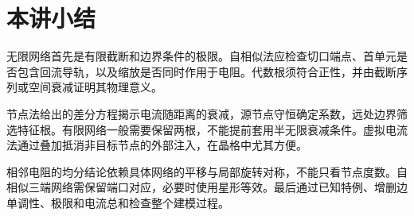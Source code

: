 \section{本讲小结}

无限网络首先是有限截断和边界条件的极限。自相似法应检查切口端点、首单元是否包含回流导轨，以及缩放是否同时作用于电阻。代数根须符合正性，并由截断序列或空间衰减证明其物理意义。

节点法给出的差分方程揭示电流随距离的衰减，源节点守恒确定系数，远处边界筛选特征根。有限网络一般需要保留两根，不能提前套用半无限衰减条件。虚拟电流法通过叠加抵消非目标节点的外部注入，在晶格中尤其方便。

相邻电阻的均分结论依赖具体网络的平移与局部旋转对称，不能只看节点度数。自相似三端网络需保留端口对应，必要时使用星形等效。最后通过已知特例、增删边单调性、极限和电流总和检查整个建模过程。

